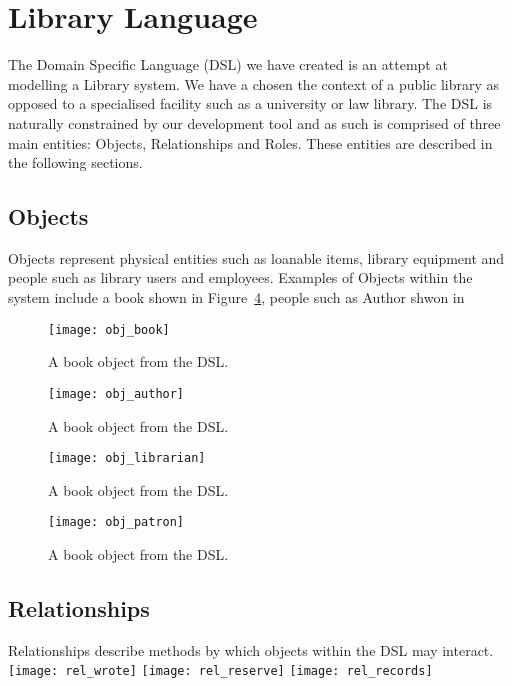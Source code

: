 \section{Library Language}
The Domain Specific Language (DSL) we have created is an attempt at modelling a Library system. We have a chosen the context of a public library as opposed to a specialised facility such as a university or law library. The DSL is naturally constrained by our development tool and as such  is comprised of three main entities: Objects, Relationships and Roles. These entities are described in the following sections. 

\subsection{Objects}
Objects represent physical entities such as loanable items, library equipment and people such as library users and employees. Examples of Objects within the system include a book shown in Figure~\ref{fig:objbook}, people such as Author shwon in 

\begin{figure}
  \centering
  \texttt{[image: obj\_book]}  
  \caption{A book object from the DSL.}
  \label{fig:objbook}
\end{figure}

\begin{figure}
  \centering
  \texttt{[image: obj\_author]}
  \caption{A book object from the DSL.}
  \label{fig:objbook}
\end{figure}

\begin{figure}
  \centering
  \texttt{[image: obj\_librarian]}
  \caption{A book object from the DSL.}
  \label{fig:objbook}
\end{figure}

\begin{figure}
  \centering
  \texttt{[image: obj\_patron]}
  \caption{A book object from the DSL.}
  \label{fig:objbook}
\end{figure}







\subsection{Relationships}
Relationships describe methods by which objects within the DSL may interact.
\texttt{[image: rel\_wrote]}
\texttt{[image: rel\_reserve]}
\texttt{[image: rel\_records]}


